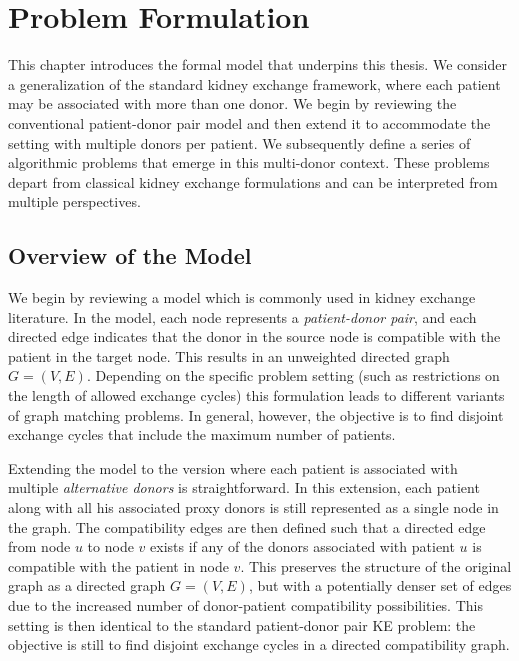 \chapter{Problem Formulation}
\label{cha:problem_formulation}

This chapter introduces the formal model that underpins this thesis. We consider a generalization of the standard kidney exchange framework, where each patient may be associated with more than one donor. We begin by reviewing the conventional patient-donor pair model and then extend it to accommodate the setting with multiple donors per patient. We subsequently define a series of algorithmic problems that emerge in this multi-donor context. These problems depart from classical kidney exchange formulations and can be interpreted from multiple perspectives.%

\section{Overview of the Model}

We begin by reviewing a model which is commonly used in kidney exchange literature. In the model, each node represents a \textit{patient-donor pair}, and each directed edge indicates that the donor in the source node is compatible with the patient in the target node. This results in an unweighted directed graph $G = (V, E)$. Depending on the specific problem setting (such as restrictions on the length of allowed exchange cycles) this formulation leads to different variants of graph matching problems. In general, however, the objective is to find disjoint exchange cycles that include the maximum number of patients.

Extending the model to the version where each patient is associated with multiple \textit{alternative donors} is straightforward. In this extension, each patient along with all his associated proxy donors is still represented as a single node in the graph. The compatibility edges are then defined such that a directed edge from node $u$ to node $v$ exists if any of the donors associated with patient $u$ is compatible with the patient in node $v$. This preserves the structure of the original graph as a directed graph $G = (V, E)$, but with a potentially denser set of edges due to the increased number of donor-patient compatibility possibilities. This setting is then identical to the standard patient-donor pair \ac{KE} problem: the objective is still to find disjoint exchange cycles in a directed compatibility graph.

